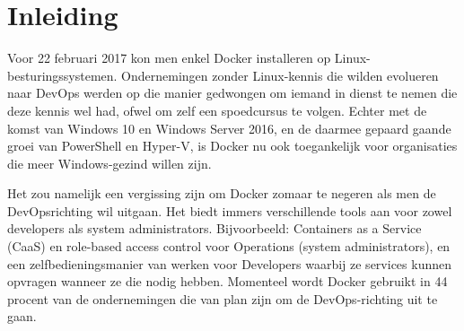 
\chapter{Inleiding}
\label{ch:inleiding}




Voor 22 februari 2017 kon men enkel Docker installeren op Linux-besturingssystemen. Ondernemingen zonder Linux-kennis die wilden evolueren naar DevOps werden op die manier gedwongen om iemand in dienst te nemen die deze kennis wel had, ofwel om zelf een spoedcursus te volgen. Echter met de komst van Windows 10 en Windows Server 2016, en de daarmee gepaard gaande groei van PowerShell en Hyper-V, is Docker nu ook toegankelijk voor organisaties die meer Windows-gezind willen zijn.

Het zou namelijk een vergissing zijn om Docker zomaar te negeren als men de DevOpsrichting wil uitgaan. Het biedt immers verschillende tools aan voor zowel developers als system administrators. Bijvoorbeeld: Containers as a Service (CaaS) en role-based access control voor Operations (system administrators), en een zelfbedieningsmanier van werken voor Developers waarbij ze services kunnen opvragen wanneer ze die nodig hebben. Momenteel wordt Docker gebruikt in 44 procent van de ondernemingen die van plan zijn om de DevOps-richting uit te gaan.

